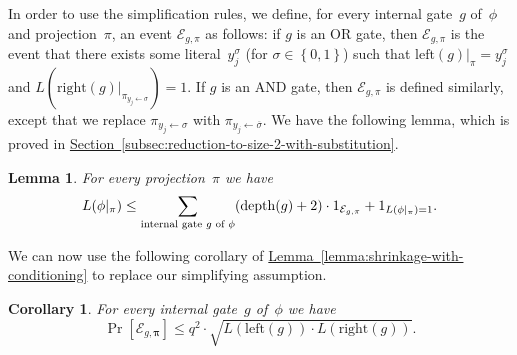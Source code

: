 \documentclass[11pt]{article}
\numberwithin{equation}{section}
\newtheorem{lemma}[theorem]{Lemma}
\newtheorem{corollary}[theorem]{Corollary}
\theoremstyle{definition}
\theoremstyle{plain}
\newcommand{\expref}[2]{\hyperref[#2]{#1~\ref{#2}}}
\theoremstyle{definition}\newtheorem{notation}[theorem]{Notation}\theoremstyle{plain}
\newcommand{\B}{\left\{ 0,1 \right \}}
\newcommand{\p}{\boldsymbol{\pi}}
\newcommand{\dpt}{\mathrm{depth}}
\newcommand{\cE}{\mathcal{E}}
\newcommand{\lc}{\mathrm{left}}
\newcommand{\rc}{\mathrm{right}}
\theoremstyle{definition}
\theoremstyle{plain}
\begin{document}
In order to use the simplification rules, we define, for every internal
gate~$g$ of~$\phi$ and projection~$\pi$, an event $\cE_{g,\pi}$
as follows: if $g$ is an OR gate, then $\cE_{g,\pi}$ is the event
that there exists some literal~$y_{j}^{\sigma}$ (for $\sigma\in\B$)
such that $\lc(g)|_{\pi}=y_{j}^{\sigma}$ and $L(\rc(g)|_{\pi_{y_{j}\gets\sigma}})=1$.
If $g$ is an AND gate, then $\cE_{g,\pi}$ is defined similarly,
except that we replace $\pi_{y_{j}\gets\sigma}$ with $\pi_{y_{j}\gets\overline{\sigma}}$.
We have the following lemma, which is proved in \expref{Section}{subsec:reduction-to-size-2-with-substitution}. 
\begin{lemma}
\label{lemma:reduction-to-size-2-with-substitution}For every projection~$\pi$
we have 
\[
L(\phi|_{\pi})\le\sum_{\text{internal gate \ensuremath{g} of \ensuremath{\phi}}}(\dpt(g)+2)\cdot1_{\cE_{g,\pi}}+1_{L(\phi|_{\pi})=1}.
\]
\end{lemma}

We can now use the following corollary of \expref{Lemma}{lemma:shrinkage-with-conditioning}
to replace our simplifying assumption. 
\begin{corollary}
\label{cor:shrinkage-to-two-literals}For every internal gate~$g$ of~$\phi$
we have 
\[
\Pr\!\left[\cE_{g,\p}\right]\le q^{2}\cdot\sqrt{L(\lc(g))\cdot L(\rc(g))}.
\]
\end{corollary}
\end{document}
